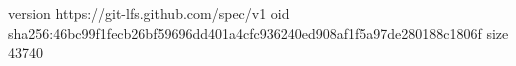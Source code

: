 version https://git-lfs.github.com/spec/v1
oid sha256:46bc99f1fecb26bf59696dd401a4cfc936240ed908af1f5a97de280188c1806f
size 43740
